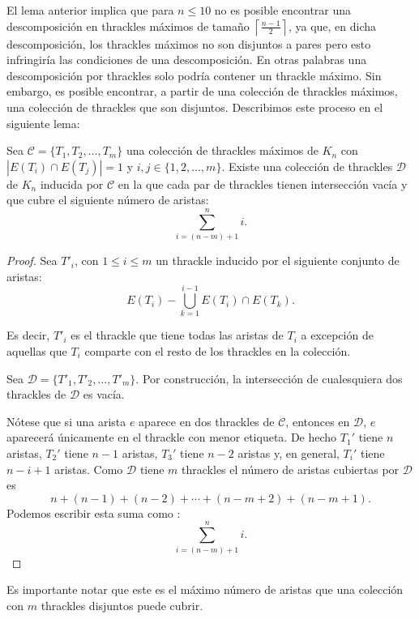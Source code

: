 El lema anterior implica que para $n\leq 10$ no es posible encontrar una
descomposición en thrackles máximos de tamaño
$\left\lceil\frac{n-1}{2}\right\rceil$, ya que, en dicha descomposición, los
thrackles máximos no son disjuntos a pares pero esto infringiría las
condiciones de una descomposición.
En otras palabras una descomposición por thrackles solo podría contener un
thrackle máximo. Sin embargo, es posible encontrar, a partir de una colección
de thrackles máximos, una colección de thrackles que son disjuntos.
Describimos este proceso en el siguiente lema:
\begin{lemma}\label{lema:existedescomp}
  Sea $\mathcal{C}=\{T_1,T_2,\dots,T_m\}$ una colección de thrackles máximos
  de $K_n$ con $|E(T_i)\cap E(T_j)| = 1$ y $ i,j \in \{1,2,\dots,m\}$.
  Existe una colección  de thrackles $\mathcal{D}$ de $K_n$ inducida por
  $\mathcal{C}$ en la que cada par de thrackles tienen intersección vacía y que
  cubre el siguiente número de aristas:
  \[\displaystyle \sum^n_{i=(n-m) + 1}i.\]
\end{lemma}
\begin{proof}
  Sea $T'_i$, con $1 \leq i \leq m$ un thrackle inducido por el siguiente
  conjunto de aristas:
  \[E(T_i) - \bigcup_{k=1}^{i-1} E(T_i)\cap E(T_k).\]

  Es decir, $T'_i$ es el thrackle que tiene todas las aristas de $T_i$
  a excepción de aquellas que $T_i$ comparte con el resto de los thrackles
  en la colección.

  Sea $\mathcal{D}=\{T'_1,T'_2,\dots,T'_m\}$. Por construcción, la intersección
  de cualesquiera dos thrackles de $\mathcal{D}$ es vacía.

  Nótese que si una arista $e$ aparece en dos thrackles de $\mathcal{C}$,
  entonces en $\mathcal{D}$, $e$ aparecerá únicamente en el thrackle con menor
  etiqueta.
  De hecho $T_1'$ tiene $n$ aristas, $T_2'$ tiene $n-1$ aristas, $T_3'$ tiene
  $n-2$ aristas y, en general, $T_i'$ tiene $n-i+1$ aristas. Como $\mathcal{D}$
  tiene $m$ thrackles el número de aristas cubiertas por $\mathcal{D}$ es
  \[ n + (n-1) + (n-2) + \cdots + (n- m + 2) + (n - m + 1).\]
  Podemos escribir esta suma como :
  \[\displaystyle \sum^n_{i=(n-m) + 1}i.\]
\end{proof}
Es importante notar que este es el máximo número de aristas que una colección
con $m$ thrackles disjuntos puede cubrir.

